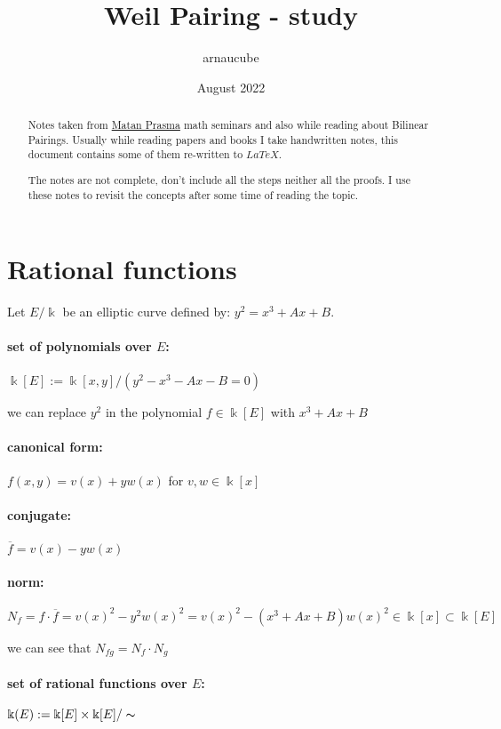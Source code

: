 \documentclass{article}
\title{Weil Pairing - study}
\author{arnaucube}
\date{August 2022}
\theoremstyle{definition}
\begin{document}
\maketitle

\begin{abstract}
  Notes taken from \href{https://sites.google.com/site/matanprasma/artifact}{Matan Prasma} math seminars and also while reading about Bilinear Pairings. Usually while reading papers and books I take handwritten notes, this document contains some of them re-written to $LaTeX$.

	The notes are not complete, don't include all the steps neither all the proofs. I use these notes to revisit the concepts after some time of reading the topic.
\end{abstract}

\tableofcontents

\section{Rational functions}

Let $E/\Bbbk$ be an elliptic curve defined by: $y^2 = x^3 + Ax + B$.

\paragraph{set of polynomials over $E$:}
$\Bbbk[E] := \Bbbk[x,y] / (y^2 - x^3 - Ax - B =0)$

we can replace $y^2$ in the polynomial $f \in \Bbbk[E]$ with $x^3 + Ax + B$

\paragraph{canonical form:} $f(x,y) = v(x)+y w(x)$ for $v, w \in \Bbbk[x]$
\paragraph{conjugate:} $\overline{f} = v(x) - y w(x)$
\paragraph{norm:} $N_f = f \cdot \overline{f} = v(x)^2 - y^2 w(x)^2 = v(x)^2 - (x^3 + Ax + B) w(x)^2 \in \Bbbk[x] \subset \Bbbk[E]$

we can see that $N_{fg} = N_f \cdot N_g$

\paragraph{set of rational functions over $E$:}
$\Bbbk(E) := \Bbbk[E] \times \Bbbk[E]/ \thicksim$
\end{document}
